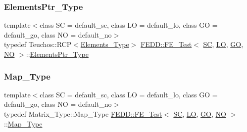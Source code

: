 \mbox{\label{classFEDD_1_1FE__Test_af8f5bc3cb82c5d60a3a63b1e5c89a678}} 
\subsubsection{\texorpdfstring{Elements\+Ptr\+\_\+\+Type}{ElementsPtr\_Type}}
{\footnotesize\ttfamily template$<$class SC  = default\+\_\+sc, class LO  = default\+\_\+lo, class GO  = default\+\_\+go, class NO  = default\+\_\+no$>$ \\
typedef Teuchos\+::\+R\+CP$<$\hyperlink{classFEDD_1_1FE__Test_a73f1a4ecb41cbeec1be473d71efe022d}{Elements\+\_\+\+Type}$>$ \hyperlink{classFEDD_1_1FE__Test}{F\+E\+D\+D\+::\+F\+E\+\_\+\+Test}$<$ \hyperlink{fe__test__laplace_8cpp_a79c7e86a57edbb2a5a53242bcd04e41e}{SC}, \hyperlink{fe__test__laplace_8cpp_ad6a38c9f07d3fd633eefca5bccad8410}{LO}, \hyperlink{fe__test__laplace_8cpp_afa2946b509009b4f45eb04bd8c5b27d9}{GO}, \hyperlink{fe__test__laplace_8cpp_a5e24f37b28787429872b6ecb1d0417ce}{NO} $>$\+::\hyperlink{classFEDD_1_1FE__Test_af8f5bc3cb82c5d60a3a63b1e5c89a678}{Elements\+Ptr\+\_\+\+Type}}

\mbox{\label{classFEDD_1_1FE__Test_a416d3abf702e778eb7fab3cd1feb3ede}} 
\subsubsection{\texorpdfstring{Map\+\_\+\+Type}{Map\_Type}}
{\footnotesize\ttfamily template$<$class SC  = default\+\_\+sc, class LO  = default\+\_\+lo, class GO  = default\+\_\+go, class NO  = default\+\_\+no$>$ \\
typedef Matrix\+\_\+\+Type\+::\+Map\+\_\+\+Type \hyperlink{classFEDD_1_1FE__Test}{F\+E\+D\+D\+::\+F\+E\+\_\+\+Test}$<$ \hyperlink{fe__test__laplace_8cpp_a79c7e86a57edbb2a5a53242bcd04e41e}{SC}, \hyperlink{fe__test__laplace_8cpp_ad6a38c9f07d3fd633eefca5bccad8410}{LO}, \hyperlink{fe__test__laplace_8cpp_afa2946b509009b4f45eb04bd8c5b27d9}{GO}, \hyperlink{fe__test__laplace_8cpp_a5e24f37b28787429872b6ecb1d0417ce}{NO} $>$\+::\hyperlink{classFEDD_1_1FE__Test_a416d3abf702e778eb7fab3cd1feb3ede}{Map\+\_\+\+Type}}

